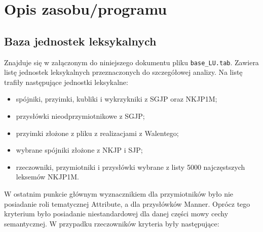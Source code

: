 \documentclass[12pt]{mwart}
\theoremstyle{remark}
\begin{document}
\section{Opis zasobu/programu}

\subsection{Baza jednostek leksykalnych}\label{baza}
Znajduje się w załączonym do niniejszego dokumentu pliku {\tt base\_LU.tab}. Zawiera listę jednostek leksykalnych
przeznaczonych do szczegółowej analizy. Na listę trafiły następujące jednostki leksykalne:
\begin{itemize}
\item spójniki, przyimki, kubliki i wykrzykniki z SGJP oraz NKJP1M;
\item przysłówki nieodprzymiotnikowe z SGJP;
\item przyimki złożone z pliku z realizacjami z Walentego;
\item wybrane spójniki złożone z NKJP i SJP;
\item rzeczowniki, przymiotniki i przysłówki wybrane z listy 5000 najczęstszych leksemów NKJP1M.
\end{itemize}
W ostatnim punkcie głównym wyznacznikiem dla przymiotników było nie posiadanie roli tematycznej Attribute, a dla przysłówków Manner.
Oprócz tego kryterium było posiadanie niestandardowej dla danej części mowy cechy semantycznej.
W przypadku rzeczowników kryteria były następujące:
\end{document}
